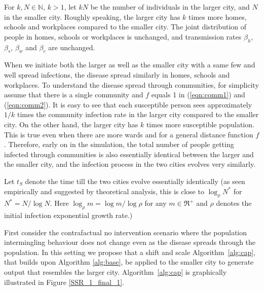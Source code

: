 \documentclass{article}
\theoremstyle{definition}
\begin{document}
For $k, N \in \mathbb{N}$, $k>1$, let $kN$ be the number of individuals in the larger city, and $N$ in the  smaller city. 
Roughly speaking, the larger city has $k$ times more homes, schools and workplaces compared to the smaller city.
The joint distribution of people in  homes, schools or workplaces is unchanged, and 
transmission rates $\beta_h$, $\beta_s$, $\beta_w$ and $\beta_c$ are unchanged.

When we initiate both the larger as well as the smaller city with a same few and well spread infections, the disease spread similarly
in homes, schools and workplaces. To understand the disease spread through communities, 
for simplicity assume that there is a single community and $f$ equals 1 in (\ref{eqn:comm1}) and (\ref{eqn:comm2}).
It is easy to see that each susceptible person sees approximately $1/k$ times the community infection rate in the larger city
compared to the smaller city. On the other hand, the larger city has $k$ times more susceptible population.
This is true even when there are more wards and for a general distance function $f$.
Therefore, early on in the simulation, the total number of people getting infected through communities is also 
essentially identical between the larger and the smaller city, and the infection process in the two cities evolves
very similarly.

 Let 
$t_{S}$ denote  the time till the two cities evolve essentially identically (as seen empirically and suggested by theoretical analysis, 
this is close to  $\log_\rho N^*$ for  $N^* = N/\log{N}$. Here  $\log_\rho m = \log {m}/\log \rho$ for any $m\in \Re^+$ and $\rho$ denotes the initial infection exponential growth rate.)

First consider the contrafactual no intervention scenario where the population intermingling behaviour does not change
even as the disease spreads through the population. In this setting we propose that a shift and scale Algorithm~\ref{alg:cap},
that builds upon Algorithm \ref{alg:base}, be applied to the smaller city to generate output that resembles the larger city.
 Algorithm~\ref{alg:cap} is graphically illustrated in Figure \ref{SSR_1_final_1}.
\end{document}
